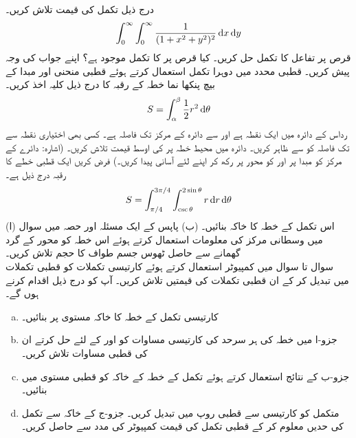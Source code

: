 درج ذیل تکمل کی قیمت   تلاش   کریں۔
\begin{align*}
\int_{0}^{\infty}\int_{0}^{\infty}\frac{1}{(1+x^2+y^2)^2}\dif x\dif y
\end{align*}
قرص  پر  تفاعل  کا   تکمل حل کریں۔ کیا قرص  پر  کا تکمل موجود ہے؟ اپنے جواب کی وجہ پیش کریں۔
قطبی محدد میں دوہرا تکمل استعمال کرتے ہوئے قطبی   منحنی  اور مبدا کے بیچ پنکھا نما خطہ کے رقبہ کا درج ذیل  کلیہ اخذ کریں۔
\begin{align*}
S=\int_{\alpha}^{\beta}\frac{1}{2}r^2\dif\theta
\end{align*}
رداس  کے دائرہ میں  ایک نقطہ  ہے اور  سے دائرہ کے مرکز تک فاصلہ  ہے۔ کسی بھی اختیاری نقطہ   سے  تک فاصلہ  کو  سے ظاہر کریں۔ دائرہ میں محیط خطہ پر  کی اوسط قیمت تلاش کریں۔ (اشارہ:  دائرے کے مرکز کو مبدا پر اور  کو محور  پر  رکھ کر اپنے لئے آسانی پیدا کریں۔)
فرض کریں ایک قطبی خطے کا  رقبہ درج ذیل ہے۔
\begin{align*}
S=\int_{\pi/4}^{3\pi/4}\int_{\csc\theta}^{2\sin\theta}r\dif r\dif\theta
\end{align*}
(ا) اس تکمل  کے خطہ کا خاکہ بنائیں۔ (ب) پاپس کے ایک مسئلہ اور حصہ  میں سوال  میں وسطانی مرکز کی معلومات استعمال کرتے ہوئے  اس خطہ کو محور  کے گرد گھمانے سے حاصل ٹھوس  جسم طواف کا حجم تلاش کریں۔
\\
سوال  تا سوال  میں کمپیوٹر استعمال کرتے ہوئے  کارتیسی  تکملات کو قطبی تکملات میں تبدیل کر کے ان قطبی تکملات کی قیمتیں تلاش کریں۔ آپ کو درج ذیل اقدام کرنے ہوں گے۔
\begin{enumerate}[a.]
\item
کارتیسی تکمل کے خطہ کا خاکہ  مستوی     پر  بنائیں۔
\item
جزو-ا میں خطہ کی ہر سرحد کی کارتیسی مساوات کو  اور  کے لئے حل کرتے  ان کی قطبی مساوات تلاش کریں۔
\item
جزو-ب کے نتائج استعمال کرتے ہوئے تکمل کے خطہ  کے  خاکہ کو قطبی  مستوی میں  بنائیں۔
\item
متکمل کو کارتیسی سے قطبی روپ میں تبدیل کریں۔ جزو-ج کے خاکہ سے تکمل کی حدیں معلوم کر کے قطبی تکمل کی قیمت کمپیوٹر کی مدد سے  حاصل کریں۔
\end{enumerate} 
